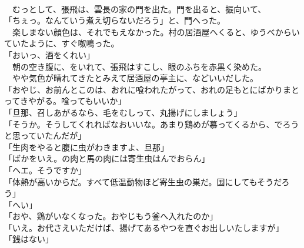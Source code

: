 \documentclass[
  paper=a5,
  fontsize=10pt,
  jafontsize=9.5pt,
  tate,                  %
  open_bracket_pos=nibu, %
]{jlreq}
\begin{document}
\\


　むっとして、張飛は、雲長の家の門を出た。門を出ると、振向いて、\\


「ちぇっ。なんていう煮え切らないだろう」と、門へった。\\


　楽しまない顔色は、それでもえなかった。村の居酒屋へくると、ゆうべからいていたように、すぐ呶鳴った。\\


「おいっ、酒をくれい」\\


　朝の空き腹に、をいれて、張飛はすこし、眼のふちを赤黒く染めた。\\


　やや気色が晴れてきたとみえて居酒屋の亭主に、などいいだした。\\


「おやじ、お前んとこのは、おれに喰われたがって、おれの足もとにばかりまとってきやがる。喰ってもいいか」\\


「旦那、召しあがるなら、毛をむしって、丸揚げにしましょう」\\


「そうか。そうしてくれればなおいいな。あまり鶏めが慕ってくるから、でろうと思っていたんだが」\\


「生肉をやると腹に虫がわきますよ、旦那」\\


「ばかをいえ。の肉と馬の肉には寄生虫はんでおらん」\\


「ヘエ。そうですか」\\


「体熱が高いからだ。すべて低温動物ほど寄生虫の巣だ。国にしてもそうだろう」\\


「へい」\\


「おや、鶏がいなくなった。おやじもう釜へ入れたのか」\\


「いえ。お代さえいただけば、揚げてあるやつを直ぐお出しいたしますが」\\


「銭はない」\\
\end{document}
